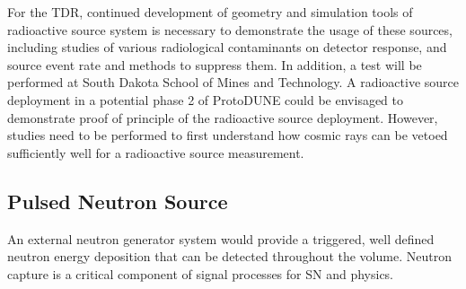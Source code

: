 For the TDR, continued development of geometry and simulation tools of radioactive source system is necessary to demonstrate the usage of these sources, including studies of various radiological contaminants on detector response, and source event rate and methods to suppress them. In addition, a test will be performed at South Dakota School of Mines and Technology. A radioactive source deployment in a potential phase 2 of ProtoDUNE could be envisaged to demonstrate proof of principle of the radioactive source deployment. However, studies need to be performed to first understand how cosmic rays can be vetoed sufficiently well for a radioactive source measurement.

\subsection{Pulsed Neutron Source}  %
\label{sec:neutron}

An external neutron generator system would provide a triggered, well defined neutron energy deposition that can be detected throughout the volume. Neutron capture is a critical component of signal processes for SN and  physics. 

